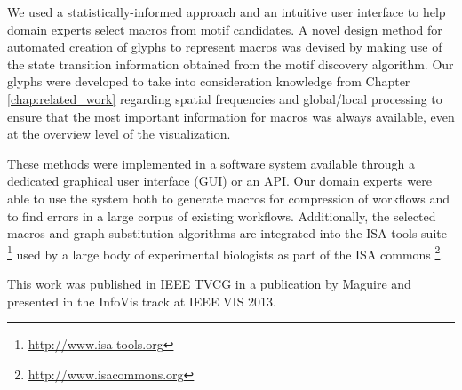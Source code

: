 We used a statistically-informed approach and an intuitive user interface to help domain experts select macros from motif candidates.
A novel design method for automated creation of glyphs to represent macros was devised by making use of the state transition information obtained from the motif discovery algorithm.
Our glyphs were developed to take into consideration knowledge from Chapter \ref{chap:related_work} regarding spatial frequencies and global/local processing to ensure that the most important information for macros was always available, even at the overview level of the visualization.

These methods were implemented in a software system available through a dedicated graphical user interface (GUI) or an API.
Our domain experts were able to use the system both to generate macros for compression of workflows and to find errors in a large corpus of existing workflows.
Additionally, the selected macros and graph substitution algorithms are integrated into the ISA tools suite \footnote{\url{http://www.isa-tools.org}} used by a large body of experimental biologists as part of the ISA commons \footnote{\url{http://www.isacommons.org}}.

This work was published in IEEE TVCG in a publication by Maguire \etal \cite{maguire13} and presented in the InfoVis track at IEEE VIS 2013.
 
